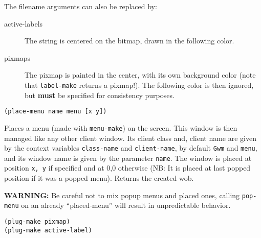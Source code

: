 The filename arguments can also be replaced by:

\begin{description} 

\item[active-labels] The string is centered on the bitmap, drawn in the
following color.

\item[pixmaps]      The pixmap is painted in the center, with its own
background color (note that \verb"label-make" returns a pixmap!). The
following color is then ignored, but {\bf must} be specified for consistency
purposes.

\end{description}


        
{\usagefont\begin{verbatim}
(place-menu name menu [x y])
\end{verbatim}}\usageupspace

Places a menu (made with \verb"menu-make") on the screen. This window is
then managed like any other client window. Its client class and,
client name are given by the context variables \verb"class-name" and
\verb"client-name", by default \verb"Gwm" and \verb"menu", and its 
window name is given by the parameter \verb"name".  The window is
placed at position {\tt x, y} if specified and at 0,0 otherwise (NB: It is
placed at last popped position if it was a popped menu). Returns the created
wob.

{\bf WARNING:} Be careful not to mix popup menus and placed ones, calling
\verb"pop-menu" on an already ``placed-menu'' will result in unpredictable
behavior. 

        
{\usagefont\begin{verbatim}
(plug-make pixmap)
(plug-make active-label)
\end{verbatim}}\usageupspace

